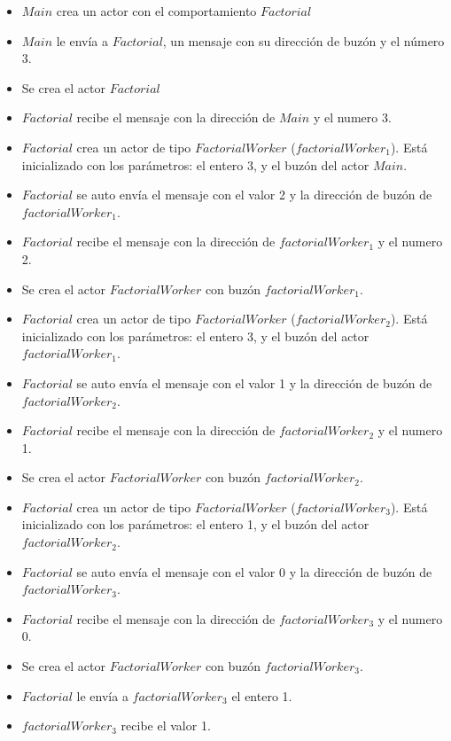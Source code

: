 \begin{itemize}
\item $Main$ crea un actor con el comportamiento $Factorial$
\item $Main$ le envía a $Factorial$, un mensaje con su dirección de buzón y el número 3.
\item Se crea el actor $Factorial$
\item $Factorial$ recibe el mensaje con la dirección de $Main$ y el numero 3.

\item $Factorial$ crea un actor de tipo $FactorialWorker$ ($factorialWorker_1$). Está inicializado con los parámetros: el entero 3, y el buzón del actor $Main$.
\item $Factorial$ se auto envía el mensaje con el valor 2 y la dirección de buzón de $factorialWorker_1$.
\item $Factorial$ recibe el mensaje con la dirección de $factorialWorker_1$ y el numero 2.
\item Se crea el actor $FactorialWorker$ con buzón $factorialWorker_1$.

\item $Factorial$ crea un actor de tipo $FactorialWorker$ ($factorialWorker_2$). Está inicializado con los parámetros: el entero 3, y el buzón del actor $factorialWorker_1$.
\item $Factorial$ se auto envía el mensaje con el valor 1 y la dirección de buzón de $factorialWorker_2$.
\item $Factorial$ recibe el mensaje con la dirección de $factorialWorker_2$ y el numero 1.
\item Se crea el actor $FactorialWorker$ con buzón $factorialWorker_2$.

\item $Factorial$ crea un actor de tipo $FactorialWorker$ ($factorialWorker_3$). Está inicializado con los parámetros: el entero 1, y el buzón del actor $factorialWorker_2$.
\item $Factorial$ se auto envía el mensaje con el valor 0 y la dirección de buzón de $factorialWorker_3$.
\item $Factorial$ recibe el mensaje con la dirección de $factorialWorker_3$ y el numero 0.
\item Se crea el actor $FactorialWorker$ con buzón $factorialWorker_3$.

\item $Factorial$ le envía a $factorialWorker_3$ el entero 1.
\item $factorialWorker_3$ recibe el valor 1.


\end{itemize}
